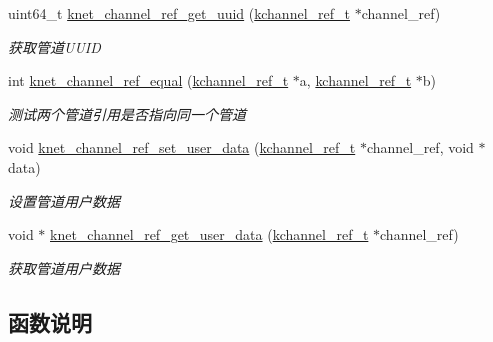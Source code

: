 \begin{DoxyCompactItemize}
uint64\+\_\+t \hyperlink{a00105_ga33f0ef5b9b57ff12a51579e222807335_ga33f0ef5b9b57ff12a51579e222807335}{knet\+\_\+channel\+\_\+ref\+\_\+get\+\_\+uuid} (\hyperlink{a00053_a3b7e82599367eade261456f60ebe2cd9_a3b7e82599367eade261456f60ebe2cd9}{kchannel\+\_\+ref\+\_\+t} $\ast$channel\+\_\+ref)
\begin{DoxyCompactList}\small\item\em 获取管道\+U\+U\+I\+D \end{DoxyCompactList}\item 
int \hyperlink{a00105_ga021034214898a7509914a336a1afb47a_ga021034214898a7509914a336a1afb47a}{knet\+\_\+channel\+\_\+ref\+\_\+equal} (\hyperlink{a00053_a3b7e82599367eade261456f60ebe2cd9_a3b7e82599367eade261456f60ebe2cd9}{kchannel\+\_\+ref\+\_\+t} $\ast$a, \hyperlink{a00053_a3b7e82599367eade261456f60ebe2cd9_a3b7e82599367eade261456f60ebe2cd9}{kchannel\+\_\+ref\+\_\+t} $\ast$b)
\begin{DoxyCompactList}\small\item\em 测试两个管道引用是否指向同一个管道 \end{DoxyCompactList}\item 
void \hyperlink{a00105_ga21f85fcd9fe24484f3dbe368eac5e9bb_ga21f85fcd9fe24484f3dbe368eac5e9bb}{knet\+\_\+channel\+\_\+ref\+\_\+set\+\_\+user\+\_\+data} (\hyperlink{a00053_a3b7e82599367eade261456f60ebe2cd9_a3b7e82599367eade261456f60ebe2cd9}{kchannel\+\_\+ref\+\_\+t} $\ast$channel\+\_\+ref, void $\ast$data)
\begin{DoxyCompactList}\small\item\em 设置管道用户数据 \end{DoxyCompactList}\item 
void $\ast$ \hyperlink{a00105_gabd02f58cb58b94071796e06bad804369_gabd02f58cb58b94071796e06bad804369}{knet\+\_\+channel\+\_\+ref\+\_\+get\+\_\+user\+\_\+data} (\hyperlink{a00053_a3b7e82599367eade261456f60ebe2cd9_a3b7e82599367eade261456f60ebe2cd9}{kchannel\+\_\+ref\+\_\+t} $\ast$channel\+\_\+ref)
\begin{DoxyCompactList}\small\item\em 获取管道用户数据 \end{DoxyCompactList}\end{DoxyCompactItemize}


\subsection{函数说明}
\hypertarget{a00105_ga92a683023f347ae7c4eb692180884a01_ga92a683023f347ae7c4eb692180884a01}{}
